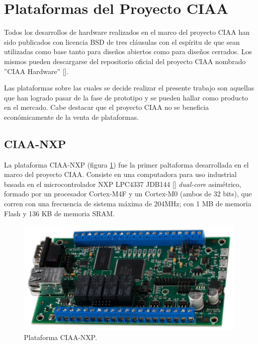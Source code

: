 \section{Plataformas del Proyecto CIAA}
\label{sec:ciaaBoards}

Todos los desarrollos de hardware realizados en el marco del proyecto CIAA han sido publicados con licencia BSD de tres cláusulas con el espíritu de que sean utilizadas como base tanto para diseños abiertos como para diseños cerrados. Los mismos pueden descargarse del repositorio oficial del proyecto CIAA nombrado ''CIAA Hardware'' [].

Las plataformas sobre las cuales se decide realizar el presente trabajo son aquellas que han logrado pasar de la fase de prototipo y se pueden hallar como producto en el mercado. Cabe destacar que el proyecto CIAA no se beneficia económicamente de la venta de plataformas.

\subsection{CIAA-NXP}

La plataforma CIAA-NXP (figura \ref{fig:ciaaNxp}) fue la primer paltaforma desarrollada en el marco del proyecto CIAA. Consiste en una computadora para uso industrial basada en el microcontrolador NXP LPC4337 JDB144 [] \emph{dual-core} asimétrico, formado por un procesador Cortex-M4F y un Cortex-M0 (ambos de 32 bits), que corren con una frecuencia de sistema máxima de 204MHz; con 1 MB de memoria Flash y 136 KB de memoria SRAM.


\begin{figure}[!htbp]
\begin{center}  %
\includegraphics*[width=\textwidth]{Figures/CIAA-NXP_Foto.png}
\par\caption{Plataforma CIAA-NXP.}\label{fig:ciaaNxp}
\end{center}
\end{figure}

